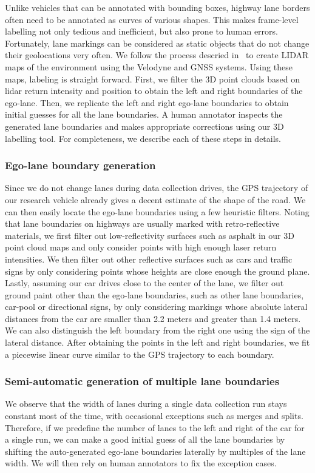 \documentclass[journal]{IEEEtran}
\begin{document}
Unlike vehicles that can be annotated with bounding boxes, highway lane borders often need to be annotated as curves of various shapes. This makes frame-level labelling not only tedious and inefficient, but also prone to human errors. Fortunately, lane markings can be considered as static objects that do not change their geolocations very often. We follow the process descried in~\cite{levinson-2011} to create LIDAR maps of the environment using the Velodyne and GNSS systems. Using these maps, labeling is straight forward. First, we filter the 3D point clouds based on lidar return intensity and position to obtain the left and right boundaries of the ego-lane. Then, we replicate the left and right ego-lane boundaries to obtain initial guesses for all the lane boundaries. A human annotator inspects the generated lane boundaries and makes appropriate corrections using our 3D labelling tool. For completeness, we describe each of these steps in details.

\subsubsection{Ego-lane boundary generation}
Since we do not change lanes during data collection drives, the GPS trajectory of our research vehicle already gives a decent estimate of the shape of the road. We can then easily locate the ego-lane boundaries using a few heuristic filters. Noting that lane boundaries on highways are usually marked with retro-reflective materials, we first filter out low-reflectivity surfaces such as asphalt in our 3D point cloud maps and only consider points with high enough laser return intensities. We then filter out other reflective surfaces such as cars and traffic signs by only considering points whose heights are close enough the ground plane.  Lastly, assuming our car drives close to the center of the lane, we filter out ground paint other than the ego-lane boundaries, such as other lane boundaries, car-pool or directional signs, by only considering markings whose absolute lateral distances from the car are smaller than 2.2 meters and greater than 1.4 meters. We can also distinguish the left boundary from the right one using the sign of the lateral distance. After obtaining the points in the left and right boundaries, we fit a piecewise linear curve similar to the GPS trajectory to each boundary.

\subsubsection{Semi-automatic generation of multiple lane boundaries}
We observe that the width of lanes during a single data collection run stays constant most of the time, with occasional exceptions such as merges and splits. Therefore, if we predefine the number of lanes to the left and right of the car for a single run, we can make a good initial guess of all the lane boundaries by shifting the auto-generated ego-lane boundaries laterally by multiples of the lane width. We will then rely on human annotators to fix the exception cases.
\end{document}
